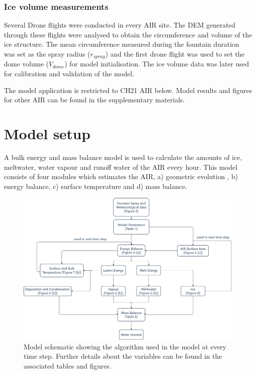 \documentclass[utf8]{frontiersSCNS} %
\begin{document}
\subsubsection{Ice volume measurements}
Several Drone flights were conducted in every AIR site. The DEM generated through these flights were analysed to obtain
the circumference and volume of the ice structure. The mean circumference measured during the fountain duration was set
as the spray radius ($r_{spray}$) and the first drone flight was used to set the dome volume ($V_{dome}$) for model
initialisation. The ice volume data was later used for calibration and validation of the model. 
 
The model application is restricted to CH21 AIR below. Model results and figures for other AIR can be found in the
supplementary materials.

\section{Model setup}

A bulk energy and mass balance model is used to calculate the amounts of ice, meltwater, water vapour and runoff water
of the AIR every hour. This model consists of four modules which estimates the AIR, a) geometric evolution , b) energy
balance, c) surface temperature and d) mass balance. 

  \begin{figure} \begin{center} \includegraphics[width=15 cm]{Figures/Figure_4.jpg} \end{center} \caption{Model
schematic showing the algorithm used in the model at every time step. Further details about the variables can be
found in the associated tables and figures.} \label{fig:schema} \end{figure}
\end{document}
